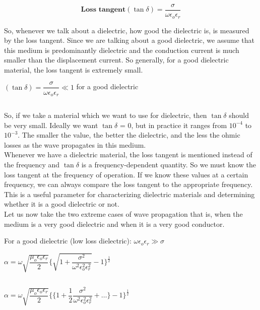 \begin{equation}
\textbf{Loss tangent}(\tan\delta) = \dfrac{\sigma}{\omega\epsilon_{o}\epsilon_{r}}
\end{equation}

So, whenever we talk about a dielectric, how good the dielectric is, is measured by the loss tangent. Since we are talking about a good dielectric, we assume that this medium is predominantly dielectric and the conduction current is much smaller than the displacement current. So generally, for a good dielectric material, the loss tangent is extremely small. 

\begin{center}
$(\tan\delta) = \dfrac{\sigma}{\omega\epsilon_{o}\epsilon_{r}} \ll 1$ for a good dielectric
\end{center}
\begin{equation}\end{equation}

So, if we take a material which we want to use for dielectric, then $\tan\delta$ should be very small. Ideally we want $\tan\delta$ = 0, but in practice it ranges from $10^{-4}$ to $10^{-3}$. The smaller the value, the better the dielectric, and the less the ohmic losses as the wave propagates in this medium.\\ 
Whenever we have a dielectric material, the loss tangent is mentioned instead of the frequency and $\tan\delta$ is a frequency-dependent quantity. So we must know the loss tangent at the frequency of operation. If we know these values at a certain frequency, we can always compare the loss tangent to the appropriate frequency. This is a useful parameter for characterizing dielectric materials and determining whether it is a good dielectric or not.\\ 
Let us now take the two extreme cases of wave propagation that is, when the medium is a very good dielectric and when it is a very good conductor.

For a good dielectric (low loss dielectric): $\omega\epsilon_{o}\epsilon_{r} \gg \sigma$

\begin{center}
$\alpha = \omega\sqrt{\dfrac{\mu_{o}\epsilon_{o}\epsilon_{r}}{2}}\Bigg\{{\sqrt{1 + \dfrac{\sigma^{2}}{\omega^{2}\epsilon_{o}^{2}\epsilon_{r}^{2}}}} - 1\Bigg\}^{\frac{1}{2}}$
\end{center}
\begin{equation}\end{equation}

\begin{center}
$\alpha = \omega\sqrt{\dfrac{\mu_{o}\epsilon_{o}\epsilon_{r}}{2}}\Bigg\{\bigg\{1 + \dfrac{1}{2} \dfrac{\sigma^{2}}{\omega^{2}\epsilon_{o}^{2}\epsilon_{r}^{2}} + \dots\bigg\} - 1\Bigg\}^{\frac{1}{2}}$
\end{center}
\begin{equation}\end{equation}

